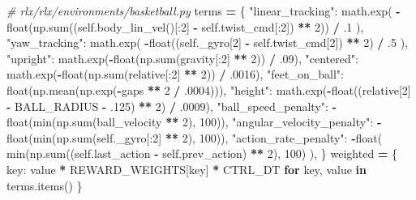 \documentclass[
  chinese,
  11pt,
  letterpaper,
]{article}
\newenvironment{Shaded}{\begin{snugshade}}{\end{snugshade}}
\newcommand{\BuiltInTok}[1]{#1}
\newcommand{\CommentTok}[1]{\textcolor[rgb]{0.56,0.35,0.01}{\textit{#1}}}
\newcommand{\ControlFlowTok}[1]{\textcolor[rgb]{0.13,0.29,0.53}{\textbf{#1}}}
\newcommand{\DecValTok}[1]{\textcolor[rgb]{0.00,0.00,0.81}{#1}}
\newcommand{\FloatTok}[1]{\textcolor[rgb]{0.00,0.00,0.81}{#1}}
\newcommand{\KeywordTok}[1]{\textcolor[rgb]{0.13,0.29,0.53}{\textbf{#1}}}
\newcommand{\NormalTok}[1]{#1}
\newcommand{\OperatorTok}[1]{\textcolor[rgb]{0.81,0.36,0.00}{\textbf{#1}}}
\newcommand{\StringTok}[1]{\textcolor[rgb]{0.31,0.60,0.02}{#1}}
\newcommand{\VariableTok}[1]{\textcolor[rgb]{0.00,0.00,0.00}{#1}}
\renewenvironment{Shaded}{\par\smallskip}{\par\smallskip}
\begin{document}
\begin{Shaded}
\begin{Highlighting}[]
\CommentTok{\# rlx/rlx/environments/basketball.py}
\NormalTok{terms }\OperatorTok{=}\NormalTok{ \{}
    \StringTok{"linear\_tracking"}\NormalTok{: math.exp(}
        \OperatorTok{{-}}\BuiltInTok{float}\NormalTok{(np.}\BuiltInTok{sum}\NormalTok{((}\VariableTok{self}\NormalTok{.body\_lin\_vel()[:}\DecValTok{2}\NormalTok{] }\OperatorTok{{-}} \VariableTok{self}\NormalTok{.twist\_cmd[:}\DecValTok{2}\NormalTok{]) }\OperatorTok{**} \DecValTok{2}\NormalTok{)) }\OperatorTok{/} \FloatTok{.1}
\NormalTok{    ),}
    \StringTok{"yaw\_tracking"}\NormalTok{: math.exp(}
        \OperatorTok{{-}}\BuiltInTok{float}\NormalTok{((}\VariableTok{self}\NormalTok{.\_gyro[}\DecValTok{2}\NormalTok{] }\OperatorTok{{-}} \VariableTok{self}\NormalTok{.twist\_cmd[}\DecValTok{2}\NormalTok{]) }\OperatorTok{**} \DecValTok{2}\NormalTok{) }\OperatorTok{/} \FloatTok{.5}
\NormalTok{    ),}
    \StringTok{"upright"}\NormalTok{: math.exp(}\OperatorTok{{-}}\BuiltInTok{float}\NormalTok{(np.}\BuiltInTok{sum}\NormalTok{(gravity[:}\DecValTok{2}\NormalTok{] }\OperatorTok{**} \DecValTok{2}\NormalTok{)) }\OperatorTok{/} \FloatTok{.09}\NormalTok{),}
    \StringTok{"centered"}\NormalTok{: math.exp(}\OperatorTok{{-}}\BuiltInTok{float}\NormalTok{(np.}\BuiltInTok{sum}\NormalTok{(relative[:}\DecValTok{2}\NormalTok{] }\OperatorTok{**} \DecValTok{2}\NormalTok{)) }\OperatorTok{/} \FloatTok{.0016}\NormalTok{),}
    \StringTok{"feet\_on\_ball"}\NormalTok{: }\BuiltInTok{float}\NormalTok{(np.mean(np.exp(}\OperatorTok{{-}}\NormalTok{gaps }\OperatorTok{**} \DecValTok{2} \OperatorTok{/} \FloatTok{.0004}\NormalTok{))),}
    \StringTok{"height"}\NormalTok{: math.exp(}\OperatorTok{{-}}\BuiltInTok{float}\NormalTok{((relative[}\DecValTok{2}\NormalTok{] }\OperatorTok{{-}}\NormalTok{ BALL\_RADIUS }\OperatorTok{{-}} \FloatTok{.125}\NormalTok{) }\OperatorTok{**} \DecValTok{2}\NormalTok{) }\OperatorTok{/} \FloatTok{.0009}\NormalTok{),}
    \StringTok{"ball\_speed\_penalty"}\NormalTok{: }\OperatorTok{{-}}\BuiltInTok{float}\NormalTok{(}\BuiltInTok{min}\NormalTok{(np.}\BuiltInTok{sum}\NormalTok{(ball\_velocity }\OperatorTok{**} \DecValTok{2}\NormalTok{), }\DecValTok{100}\NormalTok{)),}
    \StringTok{"angular\_velocity\_penalty"}\NormalTok{: }\OperatorTok{{-}}\BuiltInTok{float}\NormalTok{(}\BuiltInTok{min}\NormalTok{(np.}\BuiltInTok{sum}\NormalTok{(}\VariableTok{self}\NormalTok{.\_gyro[:}\DecValTok{2}\NormalTok{] }\OperatorTok{**} \DecValTok{2}\NormalTok{), }\DecValTok{100}\NormalTok{)),}
    \StringTok{"action\_rate\_penalty"}\NormalTok{: }\OperatorTok{{-}}\BuiltInTok{float}\NormalTok{(}
        \BuiltInTok{min}\NormalTok{(np.}\BuiltInTok{sum}\NormalTok{((}\VariableTok{self}\NormalTok{.last\_action }\OperatorTok{{-}} \VariableTok{self}\NormalTok{.prev\_action) }\OperatorTok{**} \DecValTok{2}\NormalTok{), }\DecValTok{100}\NormalTok{)}
\NormalTok{    ),}
\NormalTok{\}}
\NormalTok{weighted }\OperatorTok{=}\NormalTok{ \{}
\NormalTok{    key: value }\OperatorTok{*}\NormalTok{ REWARD\_WEIGHTS[key] }\OperatorTok{*}\NormalTok{ CTRL\_DT}
    \ControlFlowTok{for}\NormalTok{ key, value }\KeywordTok{in}\NormalTok{ terms.items()}
\NormalTok{\}}
\end{Highlighting}
\end{Shaded}
\end{document}
